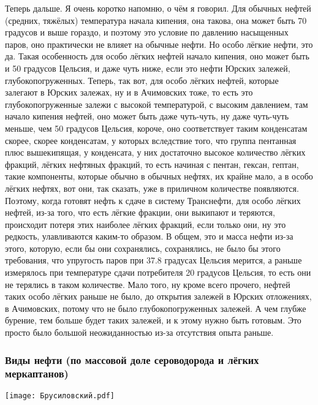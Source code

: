 \documentclass[main.tex]{subfiles}
\begin{document}
Теперь дальше.
Я очень коротко напомню, о чём я говорил.
Для обычных нефтей (средних, тяжёлых) температура начала кипения, она такова, она может быть 70 градусов и выше гораздо, и поэтому это условие по давлению насыщенных паров, оно практически не влияет на обычные нефти.
Но особо лёгкие нефти, это да.
Такая особенность для особо лёгких нефтей начало кипения, оно может быть и 50 градусов Цельсия, и даже чуть ниже, если это нефти Юрских залежей, глубокопогруженных.
Теперь, так вот, для особо лёгких нефтей, которые залегают в Юрских залежах, ну и в Ачимовских тоже, то есть это глубокопогруженные залежи с высокой температурой, с высоким давлением, там начало кипения нефтей, оно может быть даже чуть-чуть, ну даже чуть-чуть меньше, чем 50 градусов Цельсия, короче, оно соответствует таким конденсатам скорее, скорее конденсатам, у которых вследствие того, что группа пентанная плюс вышекипящая, у конденсата, у них достаточно высокое количество лёгких фракций, лёгких нефтяных фракций, то есть начиная с пентан, гексан, гептан, такие компоненты, которые обычно в обычных нефтях, их крайне мало, а в особо лёгких нефтях, вот они, так сказать, уже в приличном количестве появляются.
Поэтому, когда готовят нефть к сдаче в систему Транснефти, для особо лёгких нефтей,
из-за того, что есть лёгкие фракции, они выкипают и теряются, происходит потеря этих наиболее лёгких фракций, если только они, ну это редкость, улавливаются каким-то образом.
В общем, это и масса нефти из-за этого, которую, если бы они сохранялись, сохранялись, не было бы этого требования, что упругость паров при 37.8 градусах Цельсия мерится,
а раньше измерялось при температуре сдачи потребителя 20 градусов Цельсия, то есть они не терялись в таком количестве.
Мало того, ну кроме всего прочего, нефтей таких особо лёгких раньше не было, до открытия залежей в Юрских отложениях, в Ачимовских, потому что не было глубокопогруженных залежей.
А чем глубже бурение, тем больше будет таких залежей, и к этому нужно быть готовым.
Это просто было большой неожиданностью из-за отсутствия опыта раньше.

\subsubsection{Виды нефти (по массовой доле сероводорода и лёгких меркаптанов)}

\begin{center}
\texttt{[image: Брусиловский.pdf]}
\end{center}
\end{document}

